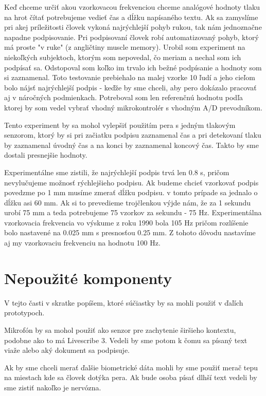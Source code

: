 Keď chceme určiť akou vzorkovacou frekvenciou chceme analógové hodnoty tlaku na hrot čítať potrebujeme vedieť čas a dĺžku napísaného textu. Ak sa zamyslíme pri akej príležitosti človek vykoná najrýchlejší pohyb rukou, tak nám jednoznačne napadne podpisovanie. Pri podpisovaní človek robí automatizovaný pohyb, ktorý má proste "v ruke" (z angličtiny muscle memory). Urobil som experiment na niekoľkých subjektoch, ktorým som nepovedal, čo meriam a nechal som ich podpísať sa. Odstopoval som koľko im trvalo ich bežné podpísanie a hodnoty som si zaznamenal. Toto testovanie prebiehalo na malej vzorke 10 ľudí a jeho cieľom bolo nájsť najrýchlejší podpis - keďže by sme chceli, aby pero dokázalo pracovať aj v náročných podmienkach. Potreboval som len referenčnú hodnotu podľa ktorej by som vedel vybrať vhodný mikrokontrolér s vhodným A/D prevodníkom. 

Tento experiment by sa mohol vylepšiť použitím pera s jedným tlakovým senzorom, ktorý by si pri začiatku podpisu zaznamenal čas a pri detekovaní tlaku by zaznamenal úvodný čas a na konci by zaznamenal koncový čas. Takto by sme dostali presnejšie hodnoty.

Experimentálne sme zistili, že najrýchlejší podpis trvá len 0.8 s, pričom nevylučujeme možnosť rýchlejšieho podpisu. Ak budeme chcieť vzorkovať podpis povedzme po 1 mm musíme zmerať dĺžku podpisu. v tomto prípade sa jednalo o dĺžku asi 60 mm. Ak si to prevedieme trojčlenkou výjde nám, že za 1 sekundu urobí 75 mm a teda potrebujeme 75 vzorkov za sekundu - 75 Hz. Experimentálna vzorkovacia frekvencia vo výskume z roku 1990\cite{SchomakerL.1990Trbp} bola 105 Hz pričom rozlíšenie bolo nastavené na 0.025 mm s presnosťou 0.25 mm. Z tohoto dôvodu nastavíme aj my vzorkovaciu frekvenciu na hodnotu 100 Hz.

\section{Nepoužité komponenty}

V tejto časti v skratke popíšem, ktoré súčiastky by sa mohli použiť v ďaľích prototypoch.

Mikrofón by sa mohol použiť ako senzor pre zachytenie širšieho kontextu, podobne ako to má Livescribe 3. Vedeli by sme potom k čomu sa písaný text viaže alebo aký dokument sa podpisuje. 

Ak by sme chceli merať ďalšie biometrické dáta mohli by sme použiť merač tepu na miestach kde sa človek dotýka pera. Ak bude osoba písať dlhší text vedeli by sme zistiť nakoľko je nervózna. 

